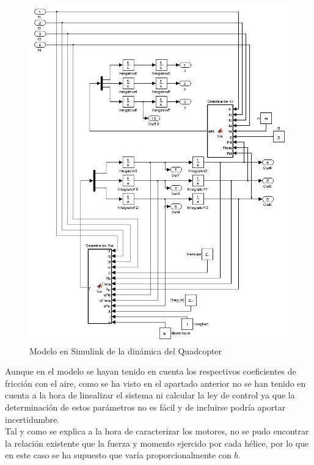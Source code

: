 \documentclass[twoside,11pt]{report}
\begin{document}
\begin{figure}[h!]
\begin{center}
\hspace{0cm} \includegraphics[scale=0.6]{images/Simulink_model.jpeg}
\caption{Modelo en Simulink de la dinámica del Quadcopter}
\end{center}
\end{figure}

Aunque en el modelo se hayan tenido en cuenta los respectivos coeficientes de fricción con el aire, como se ha visto en el apartado anterior no se han tenido en cuenta a la hora de linealizar el sistema ni calcular la ley de control ya que la determinación de estos parámetros no es fácil y de incluirse podría aportar incertidumbre. \\

Tal y como se explica a la hora de caracterizar los motores, no se pudo encontrar la relación existente que la fuerza y momento ejercido por cada hélice, por lo que en este caso se ha supuesto que varía proporcionalmente con $b$.
\end{document}
